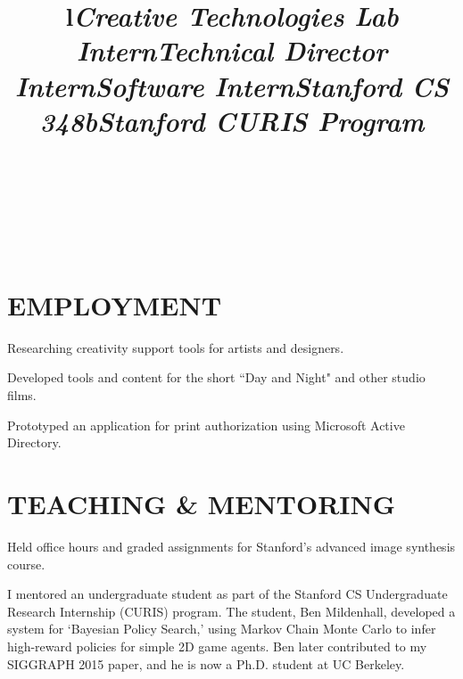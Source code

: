 \documentclass[line,margin]{res}
\begin{document}
\begin{resume}


\begin{format}
\\
\title{l}\\
\body\\
\end{format}


\section{EMPLOYMENT}

\title{\emph{Creative Technologies Lab Intern}}
\begin{position}
Researching creativity support tools for artists and designers.
\end{position}

\title{\emph{Technical Director Intern}}
\begin{position}
Developed tools and content for the short ``Day and Night" and other studio films.
\end{position}

\title{\emph{Software Intern}}
\begin{position}
Prototyped an application for print authorization using Microsoft Active Directory.
\end{position}


\section{TEACHING \& MENTORING}


\title{\emph{Stanford CS 348b}}
\begin{position}
Held office hours and graded assignments for Stanford's advanced image synthesis course.
\end{position}

\title{\emph{Stanford CURIS Program}}
\begin{position}
I mentored an undergraduate student as part of the Stanford CS Undergraduate Research Internship (CURIS) program. The student, Ben Mildenhall, developed a system for `Bayesian Policy Search,' using Markov Chain Monte Carlo to infer high-reward policies for simple 2D game agents. Ben later contributed to my SIGGRAPH 2015 paper, and he is now a Ph.D. student at UC Berkeley.
\end{position}


\end{resume}
\end{document}
